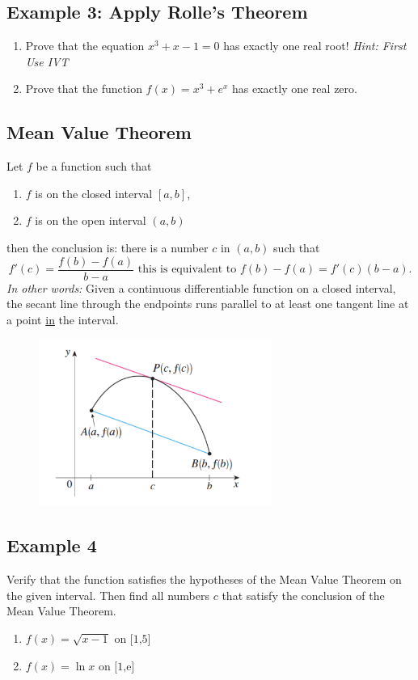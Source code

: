 \documentclass[10pt]{book}
\theoremstyle{definition}
\begin{document}
\subsection*{Example 3: Apply Rolle's Theorem}
\begin{enumerate}[label=(\alph*)]
    \item Prove that the equation $x^3+x-1=0$ has exactly one real root! \textit{Hint: First Use IVT}\vspace{4cm}
    \item Prove that the function $f(x)=x^3+e^x$ has exactly one real zero.
\end{enumerate}
\clearpage
\begin{tcolorbox}
\subsection*{Mean Value Theorem}
Let $f$ be a function such that
\begin{enumerate}
    \item $f$ is \underline{\hspace{3cm}} on the closed interval $[a,b]$,
    \item $f$ is \underline{\hspace{3cm}} on the open interval $(a,b)$
\end{enumerate}
then the conclusion is: there is a number $c$ in $(a,b)$ such that
\[
f'(c)=\frac{f(b)-f(a)}{b-a}\textrm{  this is equivalent to } f(b)-f(a)=f'(c)(b-a).
\]
\textit{In other words:} Given a continuous differentiable function on a closed interval, the secant line through the endpoints runs parallel to at least one tangent line at a point \underline{in} the interval.
\end{tcolorbox}
\begin{figure}[h!]
    \includegraphics[width=3in]{MVT.png}
\end{figure}
\subsection*{Example 4} Verify that the function satisfies the hypotheses of the Mean Value Theorem on the given interval. Then find all numbers $c$ that satisfy the conclusion of the Mean Value Theorem.
\begin{enumerate}[label=(\alph*)]
    \item $
f(x)=\sqrt{x-1}\textrm{ on [1,5]}$\vspace{4cm}
\item $f(x)=\ln x\textrm{ on [1,e]}$
\end{enumerate}
\clearpage
\end{document}
